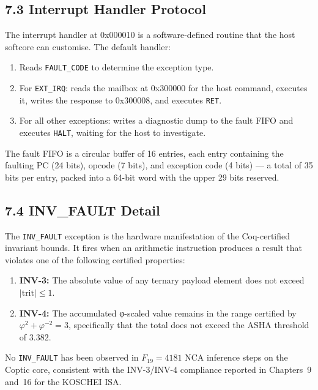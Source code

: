 \subsection{7.3 Interrupt Handler Protocol}\label{fa_71:interrupt-handler}

The interrupt handler at 0x000010 is a software-defined routine
that the host softcore can customise. The default handler:

\begin{enumerate}
\def\labelenumi{\arabic{enumi}.}
\item
  Reads \texttt{FAULT\_CODE} to determine the exception type.
\item
  For \texttt{EXT\_IRQ}: reads the mailbox at 0x300000 for
  the host command, executes it, writes the response to
  0x300008, and executes \texttt{RET}.
\item
  For all other exceptions: writes a diagnostic dump to the
  fault FIFO and executes \texttt{HALT}, waiting for the host
  to investigate.
\end{enumerate}

The fault FIFO is a circular buffer of 16 entries, each entry
containing the faulting PC (24 bits), opcode (7 bits), and
exception code (4 bits) --- a total of 35 bits per entry, packed
into a 64-bit word with the upper 29 bits reserved.

\subsection{7.4 INV\_FAULT Detail}\label{fa_71:inv-fault-detail}

The \texttt{INV\_FAULT} exception is the hardware manifestation
of the Coq-certified invariant bounds. It fires when an
arithmetic instruction produces a result that violates one of the
following certified properties:

\begin{enumerate}
\def\labelenumi{INV-\arabic{enumi}.}
\item
  \textbf{INV-3:} The absolute value of any ternary payload
  element does not exceed \(|\text{trit}| \leq 1\).
\item
  \textbf{INV-4:} The accumulated φ-scaled value remains in the
  range certified by
  \(\varphi^2 + \varphi^{-2} = 3\), specifically that the
  total does not exceed the ASHA threshold of 3.382.
\end{enumerate}

No \texttt{INV\_FAULT} has been observed in \(F_{19} = 4181\)
NCA inference steps on the Coptic core, consistent with the
INV-3/INV-4 compliance reported in Chapters~9 and~16 for the
KOSCHEI ISA.


